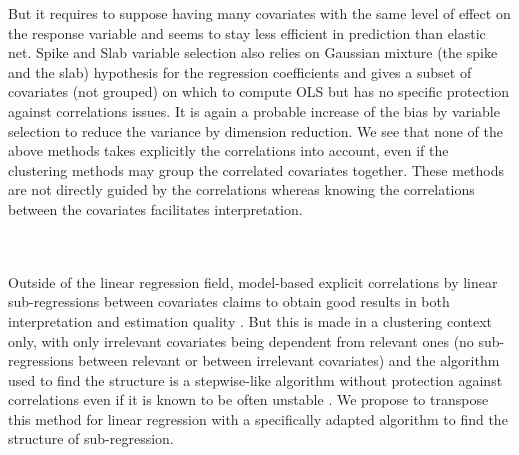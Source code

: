 \documentclass[11pt,a4paper]{article}
\begin{document}
	But it requires to suppose having many covariates with the same level of effect on the response variable and seems to stay less efficient in prediction than elastic net.
	 Spike and Slab variable selection \cite{ishwaran2005spike} also relies on Gaussian mixture (the spike and the slab) hypothesis for the regression coefficients and gives a subset of covariates (not grouped) on which to compute \textsc{OLS} but has no specific protection against correlations issues. It is again a probable increase of the bias by variable selection to reduce the variance by dimension reduction.
	We see that none of the above methods takes explicitly the correlations into account, even if the clustering methods may group the correlated covariates together.
	These methods are not directly guided by the correlations whereas knowing the correlations between the covariates facilitates interpretation.


	~\\	~\\
Outside of the linear regression field, model-based explicit correlations by linear sub-regressions between covariates  claims  to obtain good results in both interpretation and estimation quality  \cite{maugis2009variable}. But this is made in a clustering context only, with only irrelevant covariates being dependent from relevant ones (no sub-regressions between relevant or between irrelevant covariates) and the algorithm used to find the structure is a stepwise-like algorithm without protection against correlations \cite{raftery2006variable} even if it is known to be often unstable \cite{miller2002subset}. We propose to transpose this method for linear regression with a specifically adapted algorithm to find the structure of sub-regression.
 
\end{document}
